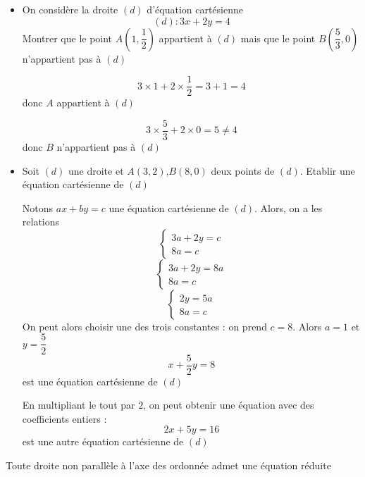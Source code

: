 \begin{exemples}
\begin{itemize}
\item On considère la droite $(d)$ d'équation cartésienne 
$$(d) : 3x+2y = 4$$
Montrer que le point $A(1,\dfrac{1}{2})$ appartient à $(d)$ mais que le point $B(\dfrac{5}{3},0)$ n'appartient pas à $(d)$\newline

$$3\times 1 + 2\times \dfrac{1}{2} = 3+1 =4$$ donc $A$ appartient à $(d)$\newline

$$3\times \dfrac{5}{3} + 2\times 0 = 5 \neq 4$$ donc $B$ n'appartient pas à $(d)$
\item Soit $(d)$ une droite et $A(3,2)$,$B(8,0)$ deux points de $(d)$. Etablir une équation cartésienne de $(d)$\newline

Notons $ax+by =c$ une équation cartésienne de $(d)$. Alors, on a les relations 
$$
\left\{\begin{array}{l}
3a + 2 y =c \\
8a = c
\end{array}\right.
$$
$$
\left\{\begin{array}{l}
3a + 2 y =8a \\
8a = c
\end{array}\right.
$$
$$
\left\{\begin{array}{l}
 2 y =5a \\
8a = c
\end{array}\right.
$$
On peut alors choisir une des trois constantes : on prend $c=8$. Alors $a=1$ et $y =\dfrac{5}{2}$ 
$$ x+ \dfrac{5}{2}y = 8$$ est une équation cartésienne de $(d)$\newline

En multipliant le tout par $2$, on peut obtenir une équation avec des coefficients entiers : 
$$2x+5y = 16$$
est une autre équation cartésienne de $(d)$
\end{itemize}
\end{exemples}
\newline

Toute droite non parallèle à l'axe des ordonnée admet une équation réduite \newline

